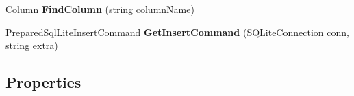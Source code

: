 \begin{DoxyCompactItemize}
\item 
\hypertarget{classSQLite_1_1TableMapping_a1b6aca5cdaa9c0f8b6f5c1ecbb12affc}{\hyperlink{classSQLite_1_1TableMapping_1_1Column}{Column} {\bfseries Find\-Column} (string column\-Name)}\label{classSQLite_1_1TableMapping_a1b6aca5cdaa9c0f8b6f5c1ecbb12affc}

\item 
\hypertarget{classSQLite_1_1TableMapping_a858d8d3031d8fca47fbc24a0bc752177}{\hyperlink{classSQLite_1_1PreparedSqlLiteInsertCommand}{Prepared\-Sql\-Lite\-Insert\-Command} {\bfseries Get\-Insert\-Command} (\hyperlink{classSQLite_1_1SQLiteConnection}{S\-Q\-Lite\-Connection} conn, string extra)}\label{classSQLite_1_1TableMapping_a858d8d3031d8fca47fbc24a0bc752177}

\end{DoxyCompactItemize}
\subsection*{Properties}
